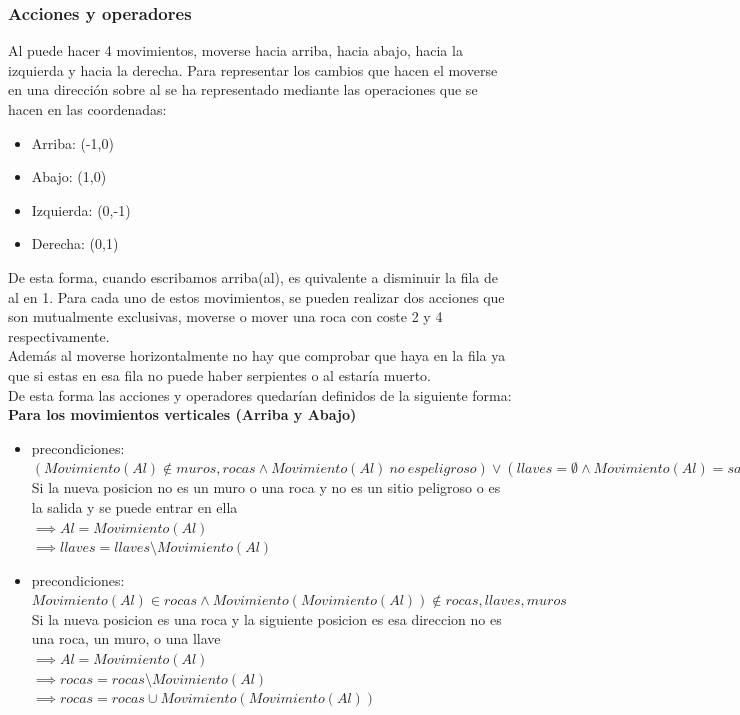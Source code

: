 \documentclass[11pt,spanish]{article}
\begin{document}
			\subsubsection{Acciones y operadores}
			Al puede hacer 4 movimientos, moverse hacia arriba, hacia abajo, hacia la izquierda y hacia la derecha. Para representar los cambios que hacen el moverse en una dirección sobre al se ha representado mediante las operaciones que se hacen en las coordenadas:
			\begin{itemize}
				\item Arriba: (-1,0)
				\item Abajo: (1,0)
				\item Izquierda: (0,-1)
				\item Derecha: (0,1)
			\end{itemize}
			De esta forma, cuando escribamos arriba(al), es quivalente a disminuir la fila de al en 1.
			Para cada uno de estos movimientos, se pueden realizar dos acciones que son mutualmente exclusivas, moverse o mover una roca con coste 2 y 4 respectivamente.\\
			Además al moverse horizontalmente no hay que comprobar que haya en la fila ya que si estas en esa fila no puede haber serpientes o al estaría muerto.\\
			De esta forma las acciones y operadores quedarían definidos de la siguiente forma:\\
			\textbf{Para los movimientos verticales (Arriba y Abajo)}
			\begin{itemize}
				\item precondiciones: $(Movimiento(Al) \notin muros, rocas \land Movimiento(Al)\ no\ es peligroso) \lor (llaves = \emptyset \land Movimiento(Al) = salida)$\\Si la nueva posicion no es un muro o una roca y no es un sitio peligroso o es la salida y se puede entrar en ella\\
				$\implies Al = Movimiento(Al)$\\
				$\implies llaves = llaves\setminus Movimiento(Al)$
				\item precondiciones: $Movimiento(Al) \in rocas \land Movimiento(Movimiento(Al)) \notin rocas, llaves, muros$\\Si la nueva posicion es una roca y la siguiente posicion es esa direccion no es una roca, un muro, o una llave\\
				$\implies Al = Movimiento(Al)$\\
				$\implies rocas = rocas\setminus Movimiento(Al)$\\
				$\implies rocas = rocas \cup Movimiento(Movimiento(Al))$
			\end{itemize}
\end{document}

